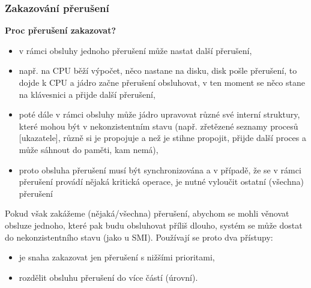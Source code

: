 \documentclass[a4paper, 11pt]{article}
\begin{document}
\subsubsection{Zakazování přerušení}
\textbf{Proc přerušení zakazovat?}
\begin{itemize}
    \item v rámci obsluhy jednoho přerušení může nastat další přerušení,
    \item např. na CPU běží výpočet, něco nastane na disku, disk pošle přerušení, to dojde k CPU a jádro začne přerušení obsluhovat, v ten moment se něco stane na klávesnici a přijde další přerušení,
    \item poté dále v rámci obsluhy může jádro upravovat různé své interní struktury, které mohou být v nekonzistentním stavu (např. zřetězené seznamy procesů [ukazatele], různě si je propojuje a než je stihne propojit, přijde další proces a může sáhnout do paměti, kam nemá),
    \item proto obsluha přerušení musí být synchronizována a v případě, že se v rámci přerušení provádí nějaká kritická operace, je nutné vyloučit ostatní (všechna) přerušení
\end{itemize}

Pokud však zakážeme (nějaká/všechna) přerušení, abychom se mohli věnovat obsluze jednoho, které pak budu obsluhovat příliš dlouho, systém se může dostat do nekonzistentního stavu (jako u SMI). Používají se proto dva přístupy:
\begin{itemize}
    \item je snaha zakazovat jen přerušení s nižšími prioritami,
    \item rozdělit obsluhu přerušení do více částí (úrovní).
\end{itemize}
 
\end{document}
